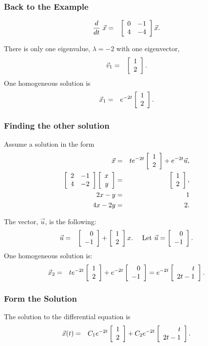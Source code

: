 \begin{frame}
  \frametitle{Back to the Example}

  \begin{eqnarray*}
    \deriv{~}{t} \vec{x} & = & \arrayTwo{0}{-1}{4}{-4} \vec{x}.
  \end{eqnarray*}


  There is only one eigenvalue, $\lambda=-2$ with one eigenvector,
  \begin{eqnarray*}
    \vec{v}_1 & = & \vecTwo{1}{2}.
  \end{eqnarray*}
  One homogeneous solution is 
  \begin{eqnarray*}
   \vec{x}_1 & = & e^{-2t}\vecTwo{1}{2}.
  \end{eqnarray*}


\end{frame}


\begin{frame}
  \frametitle{Finding the other solution}

  Assume a solution in the form
  \begin{eqnarray*}
    \vec{x} & = & t e^{-2 t} \vecTwo{1}{2} + e^{-2 t} \vec{u}, \\
    \arrayTwo{2}{-1}{4}{-2} \vecTwo{x}{y} & = & \vecTwo{1}{2}, \\
    2x-y & = & 1 \\
    4x-2y & = & 2.
  \end{eqnarray*}

  The vector, $\vec{u}$, is the following:
  \begin{eqnarray*}
    \vec{u} & = & \vecTwo{0}{-1}+\vecTwo{1}{2}x. 
  ~~~~\text{Let }  \vec{u}  =  \vecTwo{0}{-1}.
  \end{eqnarray*}
  One homogeneous solution is:
  \begin{eqnarray*}
    \vec{x}_2 & = & te^{-2t}\vecTwo{1}{2}+e^{-2t}\vecTwo{0}{-1} 
     =  e^{-2t}\vecTwo{t}{2t-1}.
  \end{eqnarray*}

\end{frame}

\begin{frame}
  \frametitle{Form the Solution}
  
  The solution to the differential equation is
  \begin{eqnarray*}
    \vec{x}(t) & = &  C_1 e^{-2t} \vecTwo{1}{2} + C_2 e^{-2t}\vecTwo{t}{2t-1}.
  \end{eqnarray*}
\end{frame}


